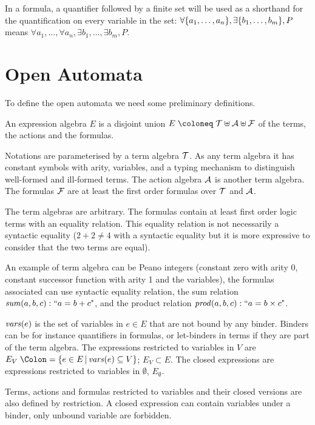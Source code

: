 \documentclass{article}
\begin{document}
In a formula, a quantifier followed by a finite set will be used as a shorthand for the quantification on every variable in the set:
\(\forall {\left\{a_1, \dots, a_n\right\}}, \exists {\left\{b_1, \dots, b_m\right\}}, P\) means \(\forall a_1, \dots, \forall a_n, \exists b_1, \dots, \exists b_m, P\).


\section{Open Automata}\label{sec:def}
To define the open automata we need some preliminary definitions.
\begin{defi}
An expression algebra \(E\) is a disjoint union \(E \defobject \terms \uplus \actions \uplus \formulas\) of the terms, the actions and the formulas.

Notations are parameterised by a term algebra \({\mathcal{T}}\).
As any term algebra it has constant symbols with arity, variables, and a typing mechanism to distinguish well-formed and ill-formed terms.
The action algebra \(\mathcal{A}\) is another term algebra.
The formulas \({\mathcal{F}}\) are at least the first order formulas over \({\mathcal{T}}\) and \(\mathcal{A}\).
\end{defi}
The term algebras are arbitrary.
The formulas contain at least first order logic terms with an equality relation.
This equality relation is not necessarily a syntactic equality (\(2 + 2 \neq 4\) with a syntactic equality but it is more expressive to consider that the two terms are equal).

An example of term algebra can be Peano integers (constant zero with arity 0, constant successor function with arity 1 and the variables), the formulas associated can use syntactic equality relation, the sum relation \(\mathit{sum}{\left(a, b, c\right)}: \text{``}a = b + c\text{"}\), and the product relation \(\mathit{prod}{\left(a, b, c\right)}: \text{``}a = b \times c\text{"}\).

\begin{defi}
 \(\mathit{vars}{\left(e\right)}\) is the set of variables in \(e \in E\) that are not bound by any binder.
	Binders can be for instance quantifiers in formulas, or let-binders in terms if they are part of the term algebra.
 The expressions restricted to variables in \(V\) are \(E_V \defnotation \mset{e \in E}{\fvars{e} \subseteq V}\); \(E_V \subset E\).
 The closed expressions are expressions restricted to variables in \(\emptyset\), \(E_\emptyset\).
\end{defi}
Terms, actions and formulas restricted to variables and their closed versions are also defined by restriction.
A closed expression can contain variables under a binder, only unbound variable are forbidden.
\end{document}
